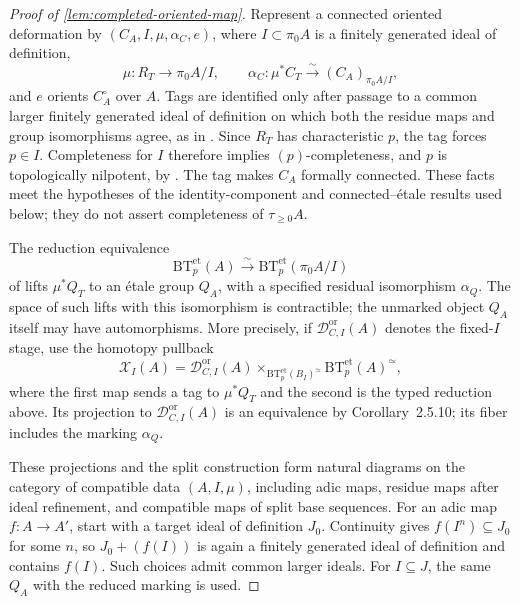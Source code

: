 \begin{proof}[Proof of \cref{lem:completed-oriented-map}]
Represent a connected oriented deformation by
\((C_A,I,\mu,\alpha_C,e)\), where \(I\subset\pi_0A\) is a finitely
generated ideal of definition,
\[
 \mu:R_T\longrightarrow\pi_0A/I,\qquad
 \alpha_C:\mu^*C_T\xrightarrow{\sim}(C_A)_{\pi_0A/I},
\]
and \(e\) orients \(C_A^\circ\) over \(A\). Tags are identified only after
passage to a common larger finitely generated ideal of definition on
which both the residue maps and group isomorphisms agree, as in
\cite[Definitions~3.1.1 and~3.1.4]{LurieEllipticII2018}.
Since \(R_T\) has characteristic \(p\), the tag forces \(p\in I\).
Completeness for \(I\) therefore implies \((p)\)-completeness, and \(p\)
is topologically nilpotent, by
\cite[Remarks~0.0.10--0.0.12]{LurieEllipticII2018}. The tag makes \(C_A\)
formally connected. These facts meet the hypotheses of the
identity-component and connected--étale results used below; they do not
assert completeness of \(\tau_{\geq0}A\).

The reduction equivalence
\[
 \mathrm{BT}^{\mathrm{et}}_p(A)\xrightarrow{\sim}
 \mathrm{BT}^{\mathrm{et}}_p(\pi_0A/I)
\]
of \cite[Corollary~2.5.10]{LurieEllipticII2018} lifts \(\mu^*Q_T\) to an
étale group \(Q_A\), with a specified residual isomorphism \(\alpha_Q\).
The space of such lifts with this isomorphism is contractible; the
unmarked object \(Q_A\) itself may have automorphisms. More precisely, if
\(\mathscr D_{C,I}^{\mathrm{or}}(A)\) denotes the fixed-\(I\) stage, use
the homotopy pullback
\[
 \mathscr X_I(A)=
 \mathscr D_{C,I}^{\mathrm{or}}(A)
 \mathop{\times}_{\mathrm{BT}^{\mathrm{et}}_p(B_I)^\simeq}
 \mathrm{BT}^{\mathrm{et}}_p(A)^\simeq ,
\]
where the first map sends a tag to \(\mu^*Q_T\) and the second is the typed
reduction above. Its projection to
\(\mathscr D_{C,I}^{\mathrm{or}}(A)\) is an equivalence by
Corollary~2.5.10; its fiber includes the marking \(\alpha_Q\).

These projections and the split construction form natural diagrams on
the category of compatible data \((A,I,\mu)\), including adic maps,
residue maps after ideal refinement, and compatible maps of split base
sequences. For an adic map \(f:A\to A'\), start with a target ideal of
definition \(J_0\). Continuity gives \(f(I^n)\subseteq J_0\) for some
\(n\), so \(J_0+(f(I))\) is again a finitely generated ideal of definition
and contains \(f(I)\). Such choices admit common larger ideals. For
\(I\subseteq J\), the same \(Q_A\) with the reduced marking is used.


\end{proof}
